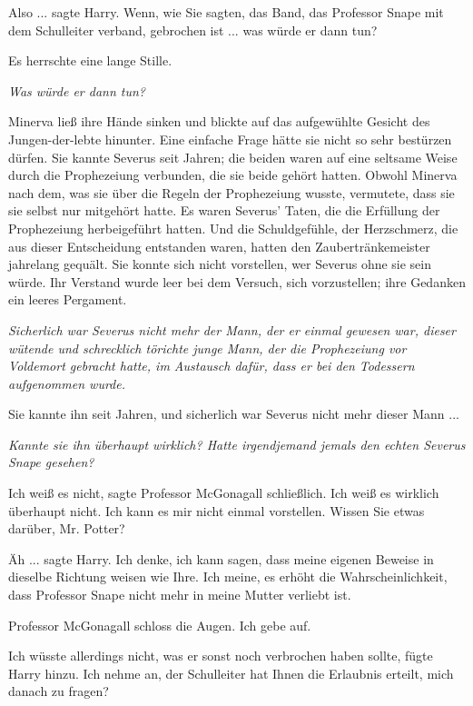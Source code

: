 \glqq{}Also ...\grqq{} sagte Harry. \glqq{}Wenn, wie Sie sagten, das Band, das
Professor Snape mit dem Schulleiter verband, gebrochen ist ... was würde er dann
tun?\grqq{}

Es herrschte eine lange Stille.

\emph{Was würde er dann tun?}

Minerva ließ ihre Hände sinken und blickte auf das aufgewühlte Gesicht des
Jungen-der-lebte hinunter. Eine einfache Frage hätte sie nicht so sehr bestürzen
dürfen. Sie kannte Severus seit Jahren; die beiden waren auf eine seltsame Weise
durch die Prophezeiung verbunden, die sie beide gehört hatten. Obwohl Minerva
nach dem, was sie über die Regeln der Prophezeiung wusste, vermutete, dass sie
sie selbst nur mitgehört hatte. Es waren Severus' Taten, die die Erfüllung der
Prophezeiung herbeigeführt hatten. Und die Schuldgefühle, der Herzschmerz, die
aus dieser Entscheidung entstanden waren, hatten den Zaubertränkemeister
jahrelang gequält. Sie konnte sich nicht vorstellen, wer Severus ohne sie sein
würde. Ihr Verstand wurde leer bei dem Versuch, sich vorzustellen; ihre Gedanken
ein leeres Pergament.

\emph{Sicherlich war Severus nicht mehr der Mann, der er einmal gewesen war,
dieser wütende und schrecklich törichte junge Mann, der die Prophezeiung vor
Voldemort gebracht hatte, im Austausch dafür, dass er bei den Todessern
aufgenommen wurde.}

Sie kannte ihn seit Jahren, und sicherlich war Severus nicht mehr dieser Mann ...

\emph{Kannte sie ihn überhaupt wirklich? Hatte irgendjemand jemals den echten
Severus Snape gesehen?}

\glqq{}Ich weiß es nicht\grqq{}, sagte Professor McGonagall schließlich. \glqq{}
Ich weiß es wirklich überhaupt nicht. Ich kann es mir nicht einmal vorstellen.
Wissen Sie etwas darüber, Mr. Potter?\grqq{}

\glqq{}Äh ...\grqq{} sagte Harry. \glqq{}Ich denke, ich kann sagen, dass meine
eigenen Beweise in dieselbe Richtung weisen wie Ihre. Ich meine, es erhöht die
Wahrscheinlichkeit, dass Professor Snape nicht mehr in meine Mutter verliebt
ist.\grqq{}

Professor McGonagall schloss die Augen. \glqq{}Ich gebe auf.\grqq{}

\glqq{}Ich wüsste allerdings nicht, was er sonst noch verbrochen haben
sollte\grqq{}, fügte Harry hinzu. \glqq{}Ich nehme an, der Schulleiter hat Ihnen
die Erlaubnis erteilt, mich danach zu fragen?\grqq{}

